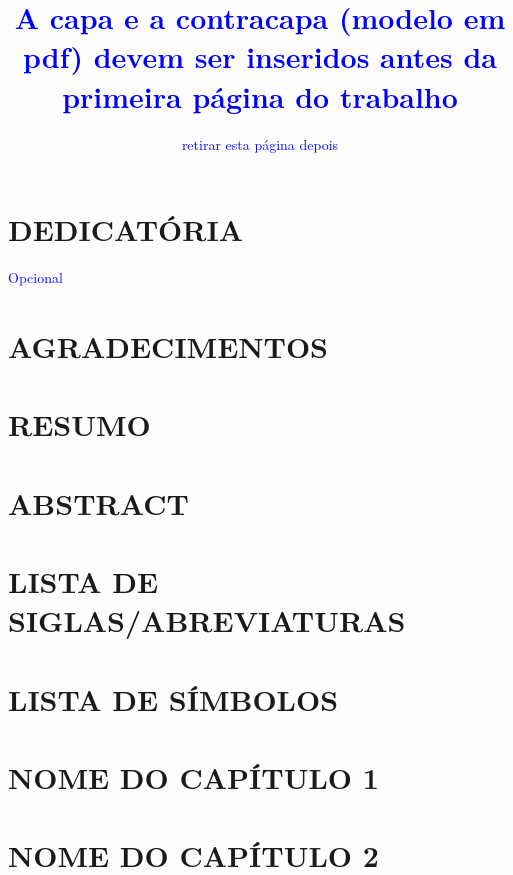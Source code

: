 \documentclass[10pt]{article}
\title{\textcolor{blue}{A capa e a contracapa (modelo em pdf) devem ser inseridos antes da primeira página do trabalho}}
\author{\textcolor{blue}{retirar esta página depois}}
\date{ }
\begin{document}
\maketitle %

\newpage
\section*{DEDICATÓRIA}
\textcolor{blue}{Opcional}\\ %


\newpage
\section*{AGRADECIMENTOS}


\newpage
\section*{RESUMO}


\newpage
\section*{ABSTRACT}


\newpage
\tableofcontents

\newpage
\listoftables

\newpage
\listoffigures

\newpage
\section*{LISTA DE SIGLAS/ABREVIATURAS}


\newpage
\section*{LISTA DE SÍMBOLOS}


\newpage
{}
\section{NOME DO CAPÍTULO 1}


\newpage
\section{NOME DO CAPÍTULO 2}   

\end{document}
